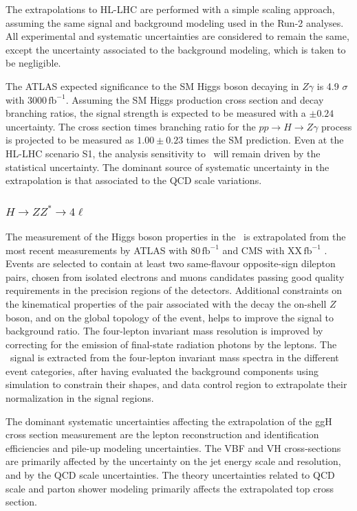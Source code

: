 The extrapolations to HL-LHC are performed with a simple scaling approach, assuming the same signal and background modeling used in the Run-2 analyses. All experimental and systematic uncertainties are considered to remain the same, except the uncertainty associated to the background modeling, which is taken to be negligible.

The ATLAS expected significance to the SM Higgs boson decaying in $Z\gamma$ is 4.9 $\sigma$ with 3000\,$\mathrm{fb}^{-1}$. Assuming the SM Higgs production cross section and decay branching ratios, the signal strength is expected to be measured with a $\pm0.24$ uncertainty. The cross section times branching ratio for the $pp\rightarrow H \rightarrow Z\gamma$ process is projected to be measured as $1.00\pm0.23$ times the SM prediction. Even at the HL-LHC scenario S1, the analysis sensitivity  to \HZy\ will remain driven by the statistical uncertainty. The dominant source of systematic uncertainty in the extrapolation is that associated to the QCD scale variations.

\subsubsection{$H \to ZZ^* \to 4\ell$}

The measurement of the Higgs boson properties in the \HZZ\ is extrapolated from the most recent measurements by ATLAS with 80\,$\mathrm{fb}^{-1}$ \cite{ATLAS:2018bsg} and CMS with XX\,$\mathrm{fb}^{-1}$ \cite{}.
Events are selected to contain at least two same-flavour opposite-sign dilepton pairs, chosen from isolated electrons and muons candidates passing good quality requirements in the precision regions of the detectors. Additional constraints on the kinematical properties of the pair associated with the decay the on-shell $Z$ boson, and on the global topology of the event, helps to improve the signal to background ratio. The four-lepton invariant mass resolution is improved by correcting for the emission of final-state radiation photons  by the leptons.
The \HZZ\ signal is extracted from the four-lepton invariant mass spectra in the different event categories, after having evaluated the background components using simulation to constrain their shapes, and data control region to extrapolate their normalization in the signal regions.

The dominant systematic uncertainties affecting the extrapolation of the ggH cross section measurement are the lepton reconstruction and identification efficiencies and pile-up modeling uncertainties. The VBF and VH cross-sections are primarily affected by the uncertainty on the jet energy scale and resolution, and by the QCD scale uncertainties. The theory uncertainties related to QCD scale and parton shower modeling primarily affects the extrapolated top cross section.

